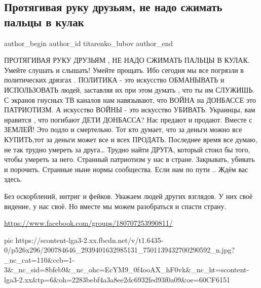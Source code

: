  
 
 
 
 
 
\subsection{Протягивая руку друзьям, не надо сжимать пальцы в кулак}
\label{sec:15_06_2021.fb.titarenko_lubov.1.isskustvo_vojny_isskustvo_ubivat}
\ifcmt
 author_begin
   author_id titarenko_lubov
 author_end
\fi

ПРОТЯГИВАЯ РУКУ ДРУЗЬЯМ , 
НЕ НАДО  СЖИМАТЬ   
ПАЛЬЦЫ В КУЛАК. 
Умейте слушать и слышать!
Умейте прощать. Ибо сегодня мы все погрязли в политических дрязгах .
ПОЛИТИКА - это 
искусство ОБМАНЫВАТЬ  
и ИСПОЛЬЗОВАТЬ людей, заставляя их при этом думать , что ты им СЛУЖИШЬ. 
С экранов гнусных ТВ каналов нам навязывают, что 
ВОЙНА на ДОНБАССЕ 
это ПАТРИОТИЗМ. 
А искусство ВОЙНЫ - это искусство УБИВАТЬ.
Украинцы, вам нравится , что погибают ДЕТИ ДОНБАССА?
Нас предают и продают. Вместе с ЗЕМЛЕЙ!
 Это подло и смертельно.
Тот кто думает, что за деньги можно все КУПИТЬ,тот за деньги  может все и всех  ПРОДАТЬ.
Последнее время все думаю,
не так трудно умереть за друга…
Трудно найти ДРУГА, который стоил бы того, чтобы умереть за него.  
Странный патриотизм  у нас в стране. Закрывать, убивать и порочить.
Странные ныне нормы сообщества. 
Если нам по пути ..
Ждём вас здесь.

Без оскорблений, интриг и фейков. Уважаем людей других взглядов. У них своё видение, у нас своё. Но вместе мы можем разобраться и спасти страну. 

 \url{https://www.facebook.com/groups/180707253990811/}

 \ifcmt
   pic https://scontent-lga3-2.xx.fbcdn.net/v/t1.6435-0/p526x296/200784646_2939401632985131_7501139432700290592_n.jpg?_nc_cat=110&ccb=1-3&_nc_sid=8bfeb9&_nc_ohc=EcYM9_0f4ooAX_hF0vk&_nc_ht=scontent-lga3-2.xx&tp=6&oh=2283bebf4a3a8ee2dc6932fed93f0a09&oe=60CF6151
 \fi


